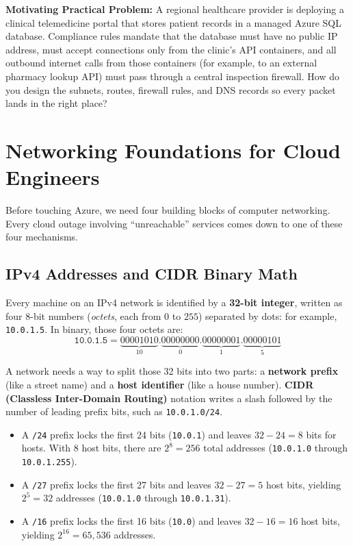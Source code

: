 \begin{chaptergoalsbox}
\textbf{Motivating Practical Problem:}
A regional healthcare provider is deploying a clinical telemedicine portal that stores patient records in a managed Azure SQL database. Compliance rules mandate that the database must have no public IP address, must accept connections only from the clinic's API containers, and all outbound internet calls from those containers (for example, to an external pharmacy lookup API) must pass through a central inspection firewall. How do you design the subnets, routes, firewall rules, and DNS records so every packet lands in the right place?
\end{chaptergoalsbox}

\section{Networking Foundations for Cloud Engineers}
\label{sec:v3-ch01-net-primer}

Before touching Azure, we need four building blocks of computer networking. Every cloud outage involving ``unreachable'' services comes down to one of these four mechanisms.

\subsection{IPv4 Addresses and CIDR Binary Math}
Every machine on an IPv4 network is identified by a \textbf{32-bit integer}, written as four 8-bit numbers (\emph{octets}, each from $0$ to $255$) separated by dots: for example, \texttt{10.0.1.5}. In binary, those four octets are:
\begin{equation*}
\texttt{10.0.1.5} = \underbrace{00001010}_{10}.\underbrace{00000000}_{0}.\underbrace{00000001}_{1}.\underbrace{00000101}_{5}
\end{equation*}

A network needs a way to split those 32 bits into two parts: a \textbf{network prefix} (like a street name) and a \textbf{host identifier} (like a house number). \textbf{CIDR (Classless Inter-Domain Routing)} notation writes a slash followed by the number of leading prefix bits, such as \texttt{10.0.1.0/24}.
\begin{itemize}[leftmargin=12pt]
  \item A \texttt{/24} prefix locks the first 24 bits (\texttt{10.0.1}) and leaves $32 - 24 = 8$ bits for hosts. With 8 host bits, there are $2^8 = 256$ total addresses (\texttt{10.0.1.0} through \texttt{10.0.1.255}).
  \item A \texttt{/27} prefix locks the first 27 bits and leaves $32 - 27 = 5$ host bits, yielding $2^5 = 32$ addresses (\texttt{10.0.1.0} through \texttt{10.0.1.31}).
  \item A \texttt{/16} prefix locks the first 16 bits (\texttt{10.0}) and leaves $32 - 16 = 16$ host bits, yielding $2^{16} = 65{,}536$ addresses.
\end{itemize}

